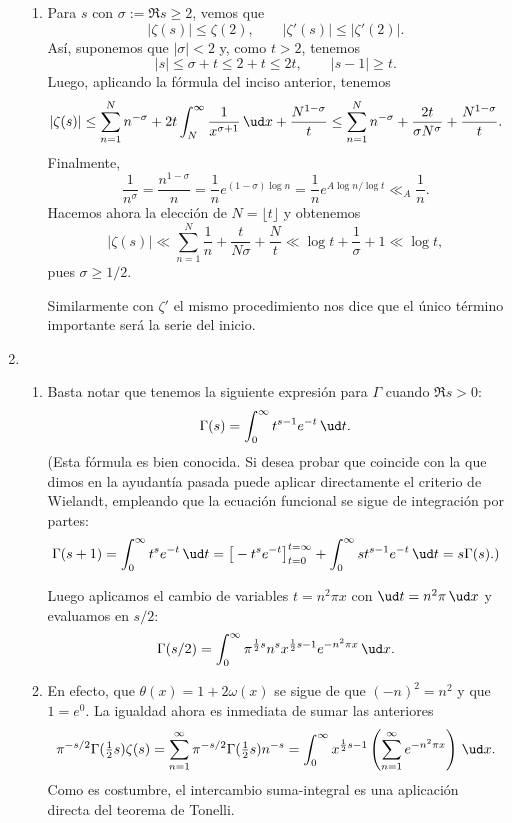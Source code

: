 \documentclass[11pt, reqno]{amsart}
\begin{document}
\begin{additional}
\begin{enumerate}
\begin{enumerate}
			\item Para $s$ con $\sigma := \Re s \ge 2$, vemos que
				\[
					|\zeta(s)| \le \zeta(2), \qquad |\zeta'(s)| \le |\zeta'(2)|.
				\]
				Así, suponemos que $|\sigma| < 2$ y, como $t > 2$, tenemos
				\[
					|s| \le \sigma + t \le 2 + t \le 2t, \qquad |s - 1| \ge t.
				\]
				Luego, aplicando la fórmula del inciso anterior, tenemos
				\[
					|\zeta(s)|
					\le \sum_{n=1}^{N} n^{-\sigma} + 2t \int_{N}^{\infty} \frac{1}{x^{\sigma+1}} \, \ud x + \frac{N^{1 - \sigma}}{t}
					\le \sum_{n=1}^{N} n^{-\sigma} + \frac{2t}{\sigma N^\sigma} + \frac{N^{1 - \sigma}}{t}.
				\]
				Finalmente,
				\[
					\frac{1}{n^\sigma} = \frac{n^{1 - \sigma}}{n} = \frac{1}{n}e^{(1 - \sigma)\log n} = \frac{1}{n} e^{A
					\log n/\log t} \ll_A \frac{1}{n}.
				\]
				Hacemos ahora la elección de $N = \lfloor t \rfloor$ y obtenemos
				\[
					|\zeta(s)|
					\ll \sum_{n=1}^{N} \frac{1}{n} + \frac{t}{N\sigma} + \frac{N}{t}
					\ll \log t + \frac{1}{\sigma} + 1 \ll \log t,
				\]
				pues $\sigma \ge 1/2$.

				Similarmente con $\zeta'$ el mismo procedimiento nos dice que el único término importante será la serie del inicio.
		\end{enumerate}

	\item
		\begin{enumerate}
			\item Basta notar que tenemos la siguiente expresión para $\Gamma$ cuando $\Re s > 0$:
				\[
					\Gamma(s) = \int_{0}^{\infty} t^{s - 1}e^{-t} \, \ud t.
				\]
				(Esta fórmula es bien conocida.
				Si desea probar que coincide con la que dimos en la ayudantía pasada puede aplicar directamente el criterio de Wielandt,
				empleando que la ecuación funcional se sigue de integración por partes:
				\[
					\Gamma(s + 1) = \int_{0}^{\infty} t^s e^{-t} \, \ud t = \big[ -t^se^{-t} \big]_{t=0}^{t=\infty} + \int_{0}^{\infty} st^{s-1} e^{-t} \, \ud t
					= s \Gamma(s).)
				\]

				Luego aplicamos el cambio de variables $t = n^2 \pi x$ con $\ud t = n^2 \pi \, \ud x$ y evaluamos en $s/2$:
				\[
					\Gamma(s/2) = \int_{0}^{\infty} \pi^{\frac{1}{2}s} n^{s} x^{ \frac{1}{2}s - 1 }e^{-n^2 \pi x} \, \ud x.
				\]

			\item En efecto, que $\theta(x) = 1 + 2 \omega(x)$ se sigue de que $(-n)^2 = n^2$ y que $1 = e^0$.
				La igualdad ahora es inmediata de sumar las anteriores
				\[
					\pi^{-s/2} \Gamma( \tfrac{1}{2}s ) \zeta(s) = \sum_{n=1}^{\infty} \pi^{-s/2} \Gamma( \tfrac{1}{2}s ) n^{-s}
					= \int_{0}^{\infty} x^{ \frac{1}{2}s - 1 } \left( \sum_{n=1}^{\infty} e^{-n^2 \pi x} \right) \, \ud x.
				\]
				Como es costumbre, el intercambio suma-integral es una aplicación directa del teorema de Tonelli.
		\end{enumerate}
\end{enumerate}
\end{additional}
\end{document}
